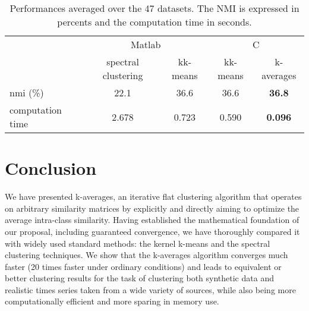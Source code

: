\documentclass[10pt,letterpaper]{article}
\begin{document}
\begin{table}
\begin{center}
\caption{Performances averaged over the 47 datasets. The NMI is expressed in percents and the computation time in seconds.}
\label{tab:resultAverage}
\begin{tabular}{lcccc}
  & \multicolumn{2}{c}{Matlab} & \multicolumn{2}{c}{C} \\
  & spectral clustering & kk-means & kk-means & k-averages \\
\hline
nmi (\%) & 22.1 & 36.6 & 36.6 & \textbf{36.8} \\
computation time & 2.678 & 0.723 & 0.590 & \textbf{0.096} \\
\end{tabular}
\end{center}
\end{table}

\section{Conclusion}

We have presented k-averages, an iterative flat clustering algorithm that operates on arbitrary similarity matrices by explicitly and directly aiming to optimize the average intra-class similarity. Having established the mathematical foundation of our proposal, including guaranteed convergence, we have thoroughly compared it with widely used standard methods: the kernel k-means and the spectral clustering techniques. We show that the k-averages algorithm converges much faster (20 times faster under ordinary conditions) and leads to equivalent or better clustering results for the task of clustering both synthetic data and realistic times series taken from a wide variety of sources, while also being more computationally efficient and more sparing in memory use.


\end{document}
